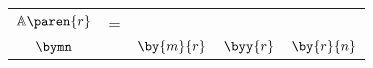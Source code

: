 \begin{table}[htdp]
\begin{center}
\begin{tabular}{ccccc}
%
  $\mathbb{A}\paren{r}$ &=& \svdg{}{*} \\
%
  $\bymn$ && $\by{m}{r}$ & $\byy{r}$ & $\by{r}{n}$
%
\end{tabular}
\end{center}
\label{tab:low rank}
\end{table}

\endinput